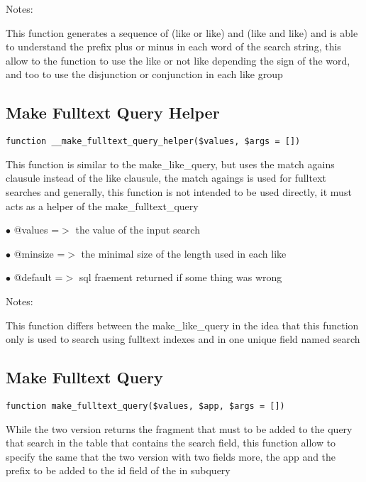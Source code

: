 \documentclass[a4paper]{book}
\begin{document}
Notes:

This function generates a sequence of (like or like) and (like and like)
and is able to understand the prefix plus or minus in each word of the
search string, this allow to the function to use the like or not like
depending the sign of the word, and too to use the disjunction or
conjunction in each like group

\hypertarget{toc248}{}
\subsection{Make Fulltext Query Helper}

\begin{lstlisting}
function __make_fulltext_query_helper($values, $args = [])
\end{lstlisting}

This function is similar to the make\_like\_query, but uses the match agains
clausule instead of the like clausule, the match agaings is used for
fulltext searches and generally, this function is not intended to be used
directly, it must acts as a helper of the make\_fulltext\_query

\begin{compactitem}
\item[\color{myblue}$\bullet$] @values  =$>$ the value of the input search
\item[\color{myblue}$\bullet$] @minsize =$>$ the minimal size of the length used in each like
\item[\color{myblue}$\bullet$] @default =$>$ sql fraement returned if some thing was wrong
\end{compactitem}

Notes:

This function differs between the make\_like\_query in the idea that this
function only is used to search using fulltext indexes and in one unique
field named search

\hypertarget{toc249}{}
\subsection{Make Fulltext Query}

\begin{lstlisting}
function make_fulltext_query($values, $app, $args = [])
\end{lstlisting}

While the two version returns the fragment that must to be added to the
query that search in the table that contains the search field, this function
allow to specify the same that the two version with two fields more, the
app and the prefix to be added to the id field of the in subquery
\end{document}
